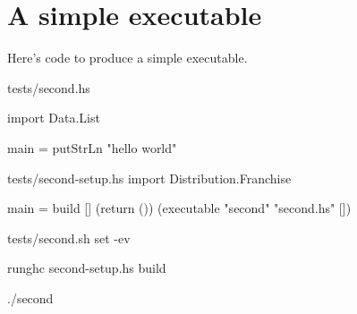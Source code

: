 \section{A simple executable}

Here's code to produce a simple executable.

\begin{file}{tests/second.hs}

import Data.List

main = putStrLn "hello world"

\end{file}

\begin{file}{tests/second-setup.hs}
import Distribution.Franchise

main = build [] (return ())
       (executable "second" "second.hs" [])

\end{file}



\begin{file}{tests/second.sh}
set -ev

runghc second-setup.hs build

./second

\end{file}
